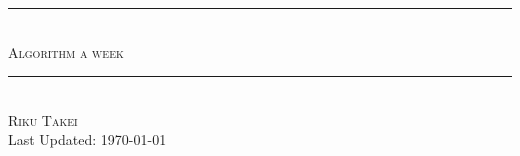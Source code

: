 \begin{titlepage}
	\centering
	\rule[2.0mm]{0.6\textwidth}{0.5mm}\\
	{\Huge \scshape Algorithm a week}
	\rule[2.0mm]{0.6\textwidth}{0.5mm}\\
	\vspace{2cm}
	{\Large \scshape Riku Takei}\\
	\vfill
	Last Updated: \today
\end{titlepage}
